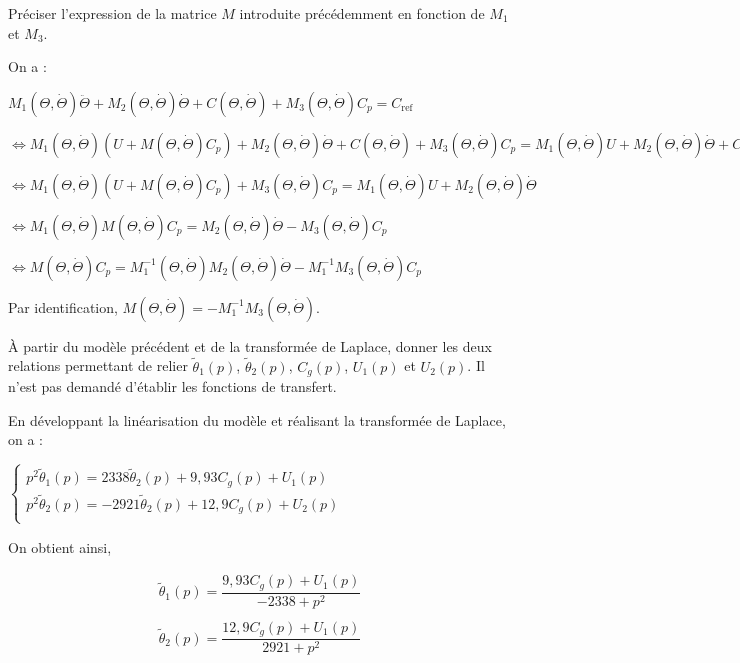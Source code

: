 \documentclass[11pt]{article}
\begin{document}
\UPSTIquestion Préciser l'expression de la matrice $M$ introduite précédemment en fonction de $M_{1}$ et $M_{3}$.
\begin{UPSTIcorrige}

On a  :

$
M_{1}(\Theta, \dot{\Theta}) \ddot{\Theta}+M_{2}(\Theta, \dot{\Theta}) \dot{\Theta}+C(\Theta, \dot{\Theta})+M_{3}(\Theta, \dot{\Theta}) C_{p}=C_{\mathrm{ref}}
$

$\Leftrightarrow
M_{1}(\Theta, \dot{\Theta}) \left(U+M(\Theta, \dot{\Theta}) C_{p}\right)   +M_{2}(\Theta, \dot{\Theta}) \dot{\Theta}+C(\Theta, \dot{\Theta})+M_{3}(\Theta, \dot{\Theta}) C_{p}=M_{1}(\Theta, \dot{\Theta}) U+M_{2}(\Theta, \dot{\Theta}) \dot{\Theta}+C(\Theta, \dot{\Theta})
$


$\Leftrightarrow
M_{1}(\Theta, \dot{\Theta}) \left(U+M(\Theta, \dot{\Theta}) C_{p}\right)   +M_{3}(\Theta, \dot{\Theta}) C_{p}=M_{1}(\Theta, \dot{\Theta}) U+M_{2}(\Theta, \dot{\Theta}) \dot{\Theta}
$

$\Leftrightarrow
M_{1}(\Theta, \dot{\Theta}) M(\Theta, \dot{\Theta}) C_{p}   =
M_{2}(\Theta, \dot{\Theta}) \dot{\Theta} - M_{3}(\Theta, \dot{\Theta}) C_{p}
$


$\Leftrightarrow
 M(\Theta, \dot{\Theta}) C_{p}   =
M_{1}^{-1}(\Theta, \dot{\Theta}) M_{2}(\Theta, \dot{\Theta}) \dot{\Theta} - M_{1}^{-1}M_{3}(\Theta, \dot{\Theta}) C_{p}
$

Par identification, $M(\Theta, \dot{\Theta}) = - M_{1}^{-1}M_{3}(\Theta, \dot{\Theta}) $.
\end{UPSTIcorrige}


\UPSTIquestion À partir du modèle précédent et de la transformée de Laplace, donner les deux relations permettant de relier $\tilde{\theta}_1(p)$, $\tilde{\theta}_2(p)$, $C_g(p)$, $U_1(p)$ et $U_2(p)$. Il n’est pas demandé d’établir les fonctions de transfert.

\begin{UPSTIcorrige}
En développant la linéarisation du modèle et réalisant la transformée de Laplace, on a :

$
\left\{
\begin{array}{l}
p^2 \tilde{\theta}_1(p) = 2338 \tilde{\theta}_2(p) + 9,93 C_g(p) + U_1(p) \\
p^2 \tilde{\theta}_2(p) = -2921 \tilde{\theta}_2(p) + 12,9 C_g(p) + U_2(p) \\
\end{array}
\right.
$

On obtient ainsi,

\begin{align*}
\tilde{\theta}_1(p)=\dfrac{ 9,93 C_g(p) + U_1(p)}{-2338+p^2}\\
\\
\tilde{\theta}_2(p)=\dfrac{ 12,9 C_g(p) + U_1(p)}{2921+p^2}
\end{align*}


\end{UPSTIcorrige}
\end{document}
